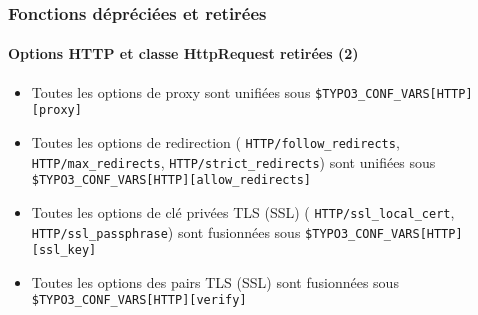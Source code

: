 \begin{frame}[fragile]
	\frametitle{Fonctions dépréciées et retirées}
	\framesubtitle{Options HTTP et classe HttpRequest retirées (2)}

	\begin{itemize}

		\item Toutes les options de proxy sont unifiées sous \newline
			\small\texttt{\$TYPO3\_CONF\_VARS[HTTP][proxy]}\normalsize

		\item Toutes les options de redirection
			(\small
				\texttt{HTTP/follow\_redirects},
				\texttt{HTTP/max\_redirects},
				\texttt{HTTP/strict\_redirects}\normalsize)
			sont unifiées sous
			\small
				\texttt{\$TYPO3\_CONF\_VARS[HTTP][allow\_redirects]}
			\normalsize

		\item Toutes les options de clé privées TLS (SSL)
			(\small
				\texttt{HTTP/ssl\_local\_cert},
				\texttt{HTTP/ssl\_passphrase}\normalsize)
			sont fusionnées sous
			\small
				\texttt{\$TYPO3\_CONF\_VARS[HTTP][ssl\_key]}
			\normalsize

		\item Toutes les options des pairs TLS (SSL) sont fusionnées sous
			\small
				\texttt{\$TYPO3\_CONF\_VARS[HTTP][verify]}
			\normalsize

	\end{itemize}

\end{frame}


